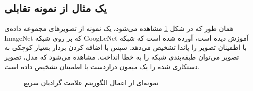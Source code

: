 \subsection{یک مثال از نمونه تقابلی}
همان طور که در شکل 
\ref{fgsmEx}
‏مشاهده می‌شود، یک نمونه از تصویر‌های مجموعه داده‌ی ‌ImageNet  که بر روی شبکه GoogLeNet آموزش دیده است، آورده شده است که شبکه با اطمینان
تصویر را پاندا تشخیص می‌دهد. سپس با اضافه کردن بردار بسیار کوچکی به تصویر می‌توان طبقه‌بندی شبکه را به خطا انداخت. مشاهده می‌شود که مدل، تصویر دستکاری شده را یک میمون درازدست با اطمینان
تشخیص داده است.
\begin{figure}[H]
\caption{نمونه‌ای از اعمال الگوریتم علامت گرادیان سریع
	\cite{Goodfellow2015ExplainingAH}}
\label{fgsmEx}
\end{figure}
